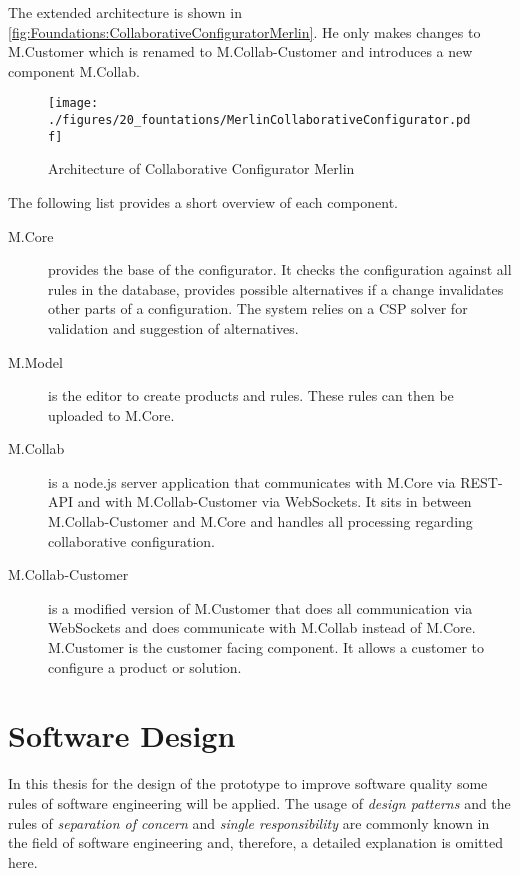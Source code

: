 The extended architecture is shown in \autoref{fig:Foundations:CollaborativeConfiguratorMerlin}.
He only makes changes to M.Customer which is renamed to M.Collab-Customer and introduces a new component M.Collab.

\begin{figure}
    \centering
    \texttt{[image: ./figures/20\_fountations/MerlinCollaborativeConfigurator.pdf]}
    \caption[Architecture: Collaborative Configurator]{Architecture of Collaborative Configurator Merlin \cite[Fig. 4.3]{raabKollaborativeProduktkonfigurationEchtzeit2019}}
    \label{fig:Foundations:CollaborativeConfiguratorMerlin}
\end{figure}

The following list provides a short overview of each component.

\begin{description}
    \item[M.Core] provides the base of the configurator. It checks the configuration against all rules in the database, provides possible alternatives if a change invalidates other parts of a configuration. The system relies on a CSP solver for validation and suggestion of alternatives.
    \item[M.Model] is the editor to create products and rules. These rules can then be uploaded to M.Core.
    \item[M.Collab] is a node.js server application that communicates with M.Core via REST-API and with M.Collab-Customer via WebSockets. It sits in between M.Collab-Customer and M.Core and handles all processing regarding collaborative configuration.
    \item[M.Collab-Customer] is a modified version of M.Customer that does all communication via WebSockets and does communicate with M.Collab instead of M.Core. M.Customer is the customer facing component. It allows a customer to configure a product or solution. 
\end{description}

\section{Software Design}
\label{sec:Foundations:BaseSystem}

In this thesis for the design of the prototype to improve software quality some rules of software engineering will be applied. The usage of \emph{design patterns} \cite{gamma2015design} and the rules of \emph{separation of concern} \cite{de2002importance} and \emph{single responsibility} \cite{martinCleanArchitectureCraftsman2017} are commonly known in the field of software engineering and, therefore, a detailed explanation is omitted here.



